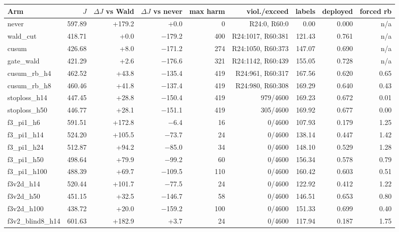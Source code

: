 \begin{tabular}{@{}l r r r r r r r r@{}}
\toprule
Arm & $J$ & $\Delta J$ vs Wald & $\Delta J$ vs never & max harm & viol./exceed & labels & deployed & forced rb \\
\midrule
never & 597.89 & +179.2 & +0.0 & 0 & R24:0, R60:0 & 0.00 & 0.000 & n/a \\
wald\_cut & 418.71 & +0.0 & $-$179.2 & 400 & R24:1017, R60:381 & 121.43 & 0.761 & n/a \\
cusum & 426.68 & +8.0 & $-$171.2 & 274 & R24:1050, R60:373 & 147.07 & 0.690 & n/a \\
gate\_wald & 421.29 & +2.6 & $-$176.6 & 321 & R24:1142, R60:439 & 155.05 & 0.728 & n/a \\
cusum\_rb\_h4 & 462.52 & +43.8 & $-$135.4 & 419 & R24:961, R60:317 & 167.56 & 0.620 & 0.65 \\
cusum\_rb\_h8 & 460.46 & +41.8 & $-$137.4 & 419 & R24:980, R60:308 & 169.29 & 0.640 & 0.43 \\
stoploss\_h14 & 447.45 & +28.8 & $-$150.4 & 419 & 979/4600 & 169.23 & 0.672 & 0.01 \\
stoploss\_h50 & 446.77 & +28.1 & $-$151.1 & 419 & 305/4600 & 169.92 & 0.677 & 0.00 \\
f3\_pi1\_h6 & 591.51 & +172.8 & $-$6.4 & 16 & 0/4600 & 107.93 & 0.179 & 1.25 \\
f3\_pi1\_h14 & 524.20 & +105.5 & $-$73.7 & 24 & 0/4600 & 138.14 & 0.447 & 1.42 \\
f3\_pi1\_h24 & 512.87 & +94.2 & $-$85.0 & 34 & 0/4600 & 148.10 & 0.529 & 1.28 \\
f3\_pi1\_h50 & 498.64 & +79.9 & $-$99.2 & 60 & 0/4600 & 156.34 & 0.578 & 0.79 \\
f3\_pi1\_h100 & 488.39 & +69.7 & $-$109.5 & 110 & 0/4600 & 160.42 & 0.603 & 0.51 \\
f3v2d\_h14 & 520.44 & +101.7 & $-$77.5 & 24 & 0/4600 & 122.92 & 0.412 & 1.22 \\
f3v2d\_h50 & 451.15 & +32.5 & $-$146.7 & 58 & 0/4600 & 146.51 & 0.653 & 0.80 \\
f3v2d\_h100 & 438.72 & +20.0 & $-$159.2 & 100 & 0/4600 & 151.33 & 0.699 & 0.40 \\
f3v2\_blind8\_h14 & 601.63 & +182.9 & +3.7 & 24 & 0/4600 & 117.94 & 0.187 & 1.75 \\
\bottomrule
\end{tabular}
